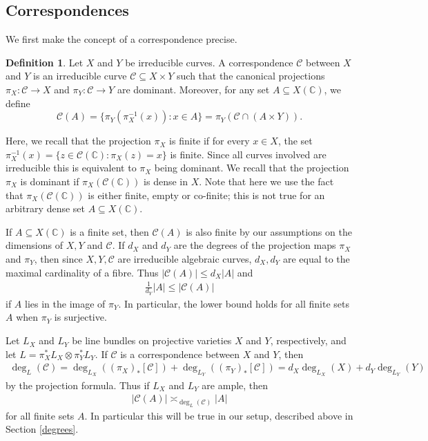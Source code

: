 \documentclass[12pt, reqno]{amsart}
\newcommand{\C}{\mathbb{C}}
\theoremstyle{remark}
\theoremstyle{definition}
\newtheorem{definition}[theorem]{Definition}
\numberwithin{equation}{section}
\begin{document}
\subsection{Correspondences}

We first make the concept of a correspondence precise.
\begin{definition}
    Let $X$ and $Y$ be irreducible curves. A correspondence $\mathcal{C}$ between $X$ and $Y$ is an irreducible curve $\mathcal{C} \subseteq X \times Y$ such that the canonical projections $\pi_X: \mathcal{C} \to X$ and $\pi_Y: \mathcal{C} \to Y$ are dominant. Moreover, for any set $A \subseteq X(\C)$, we define 
    \[ \mathcal{C}(A) = \{ \pi_Y( \pi_X^{-1}(x)) : x \in A\} =  \pi_Y( \mathcal{C} \cap (A \times Y) ).\]
\end{definition}

 Here, we recall that the projection $\pi_X$ is finite if for every $x \in X$, the set $\pi_X^{-1}(x) = \{ z \in \mathcal{C}(\C) : \pi_X(z) = x\}$ is finite. Since all curves involved are irreducible this is equivalent to $\pi_X$ being dominant.  We recall that the projection $\pi_X$ is dominant if $\pi_X(\mathcal{C}(\C))$ is dense in $X$. Note that here we use the fact that $\pi_X(\mathcal{C}(\C))$ is either finite, empty or co-finite; this is not true for an arbitrary dense set $A \subseteq X(\C)$.

If $A \subseteq X(\C)$ is a finite set, then $\mathcal{C}(A)$ is also finite by our assumptions on the dimensions of $X, Y$ and $\mathcal{C}$. If $d_X$ and $d_Y$ are the degrees of the projection maps $\pi_X$ and $\pi_Y$, then since $X,Y,\mathcal{C}$ are irreducible algebraic curves, $d_X, d_Y$ are equal to the maximal cardinality of a fibre. Thus $|\mathcal{C}(A)| \leq d_X |A|$ and
\begin{align*}
    \frac{1}{d_Y} |A| \leq |\mathcal{C}(A)|
\end{align*}
if $A$ lies in the image of $\pi_Y$. In particular, the lower bound holds for all finite sets $A$ when $\pi_Y$ is surjective.

Let $L_X$ and $L_Y$ be line bundles on projective varieties $X$ and $Y$, respectively, and let $L = \pi_X^\ast L_X \otimes \pi_Y^\ast L_Y$. If $\mathcal{C}$ is a correspondence between $X$ and $Y$, then
\begin{align*}
    \deg_L(\mathcal{C}) =
    \deg_{L_X}((\pi_X)_\ast [\mathcal{C}]) +
    \deg_{L_Y}((\pi_Y)_\ast [\mathcal{C}]) =
    d_X \deg_{L_X}(X) + d_Y \deg_{L_Y}(Y)
\end{align*}
by the projection formula. Thus if $L_X$ and $L_Y$ are ample, then
\begin{align*}
    |\mathcal{C}(A)| \asymp_{\deg_L(\mathcal{C})} |A|
\end{align*}
for all finite sets $A$. In particular this will be true in our setup, described above in Section \ref{degrees}.
\end{document}
